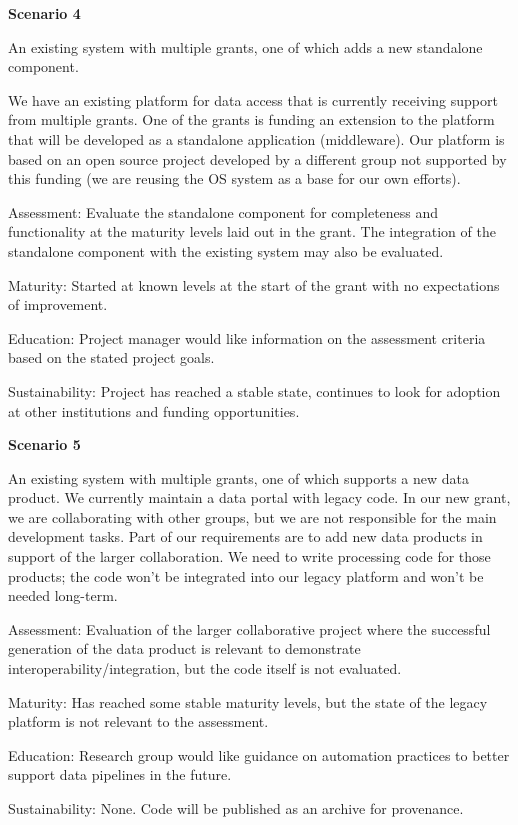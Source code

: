 \documentclass{article}
\begin{document}
\textbf{Scenario 4} 
\begin{adjustwidth}{1cm}{0cm}
An existing system with multiple grants, one of which adds a new standalone component.

We have an existing platform for data access that is currently receiving support from multiple grants. One of the grants is funding an extension to the platform that will be developed as a standalone application (middleware). Our platform is based on an open source project developed by a different group not supported by this funding (we are reusing the OS system as a base for our own efforts).
 
Assessment: Evaluate the standalone component for completeness and functionality at the maturity levels laid out in the grant. The integration of the standalone component with the existing system may also be evaluated.
 
Maturity: Started at known levels at the start of the grant with no expectations of improvement. 
 
Education: Project manager would like information on the assessment criteria based on the stated project goals. 
 
Sustainability: Project has reached a stable state, continues to look for adoption at other institutions and funding opportunities.
\end{adjustwidth}

\textbf{Scenario 5} 
\begin{adjustwidth}{1cm}{0cm}
An existing system with multiple grants, one of which supports a new data product.
We currently maintain a data portal with legacy code. In our new grant, we are collaborating with other groups, but we are not responsible for the main development tasks. Part of our requirements are to add new data products in support of the larger collaboration. We need to write processing code for those products; the code won’t be integrated into our legacy platform and won’t be needed long-term.
 
Assessment: Evaluation of the larger collaborative project where the successful generation of the data product is relevant to demonstrate interoperability/integration, but the code itself is not evaluated. 
 
Maturity: Has reached some stable maturity levels, but the state of the legacy platform is not relevant to the assessment.
 
Education: Research group would like guidance on automation practices to better support data pipelines in the future.
 
Sustainability: None. Code will be published as an archive for provenance.
\end{adjustwidth}
\end{document}
